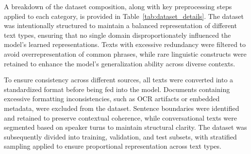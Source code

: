 \documentclass{article}
\begin{document}
A breakdown of the dataset composition, along with key preprocessing steps applied to each category, is provided in Table~\ref{tab:dataset_details}. The dataset was intentionally structured to maintain a balanced representation of different text types, ensuring that no single domain disproportionately influenced the model's learned representations. Texts with excessive redundancy were filtered to avoid overrepresentation of common phrases, while rare linguistic constructs were retained to enhance the model's generalization ability across diverse contexts.

\begin{table}[h]
	\centering
	\caption{Dataset composition and preprocessing steps applied to each category}
	\label{tab:dataset_details}
	\renewcommand{\arraystretch}{1.2}
	\setlength{\arrayrulewidth}{0.4mm}
	\setlength{\tabcolsep}{8pt}
\end{table}

To ensure consistency across different sources, all texts were converted into a standardized format before being fed into the model. Documents containing excessive formatting inconsistencies, such as OCR artifacts or embedded metadata, were excluded from the dataset. Sentence boundaries were identified and retained to preserve contextual coherence, while conversational texts were segmented based on speaker turns to maintain structural clarity. The dataset was subsequently divided into training, validation, and test subsets, with stratified sampling applied to ensure proportional representation across text types.
\end{document}
